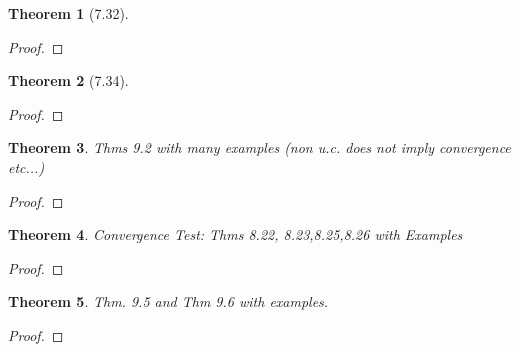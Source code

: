 \documentclass[aps,pra,notitlepage,amsmath,amssymb,letterpaper,12pt]{revtex4-1}
\newtheorem{theorem}{Theorem}
\begin{document}
\begin{theorem}[7.32]
\end{theorem}
\begin{proof}
\end{proof}

\begin{theorem}[7.34]
\end{theorem}
\begin{proof}
\end{proof}

\begin{theorem}
Thms 9.2 with many examples (non u.c. does not imply convergence etc...)
\end{theorem}

\begin{proof}
\end{proof}

\begin{theorem}
Convergence Test: Thms 8.22, 8.23,8.25,8.26 with Examples
\end{theorem}

\begin{proof}
\end{proof}

\begin{theorem}
Thm. 9.5 and Thm 9.6 with examples.
\end{theorem}

\begin{proof}
\end{proof}
\end{document}

